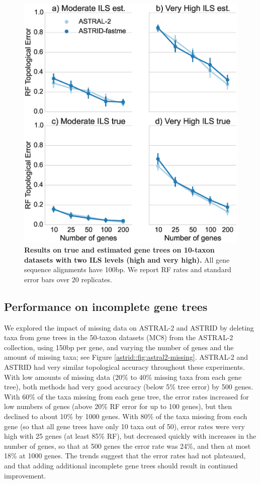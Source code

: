\begin{figure}
  \centering
  \includegraphics[width=12cm]{astrid-figs/10-taxon.eps}
  \caption[Results on true and estimated gene trees on 10-taxon datasets
with two ILS levels]{\textbf{Results on true and estimated gene trees on 10-taxon datasets
with two ILS levels (high and very high).}
      All gene sequence alignments have 100bp. We report RF rates and standard error bars over 20
    replicates. 
}
  \label{astrid::fig:10-taxon}
\end{figure}


\subsection{Performance on incomplete gene trees}
We explored the impact of missing data on
ASTRAL-2 and ASTRID by deleting taxa from gene trees
in the 
50-taxon datasets (MC8) from the ASTRAL-2 collection, 
using
150bp per gene, and varying the
number of genes and the amount of missing taxa; see Figure
\ref{astrid::fig:astral2-missing}. 
ASTRAL-2 
 and ASTRID had 
very similar 
topological accuracy throughout
these experiments. With low amounts of
missing data (20\% to 40\% missing taxa from each
gene tree), both methods had very good
accuracy (below 5\% tree error) by 500
genes. With 60\%  of the taxa missing from each gene tree,
the error rates increased for low
numbers of genes (above 20\% RF error for
up to 100 genes), but then declined to about 10\% by
1000 genes. 
With 80\% of the taxa missing from
each gene (so that all gene trees have only 10 taxa out of 50),
error rates were very high with 
25 genes (at least 85\% RF), but decreased quickly with increases
in the number of genes, so that
at 500 genes the error rate was 24\%, and
then at most 18\% at 1000 genes.
The trends suggest that
the error rates had not plateaued, and that adding additional
incomplete gene trees should result in continued improvement.

